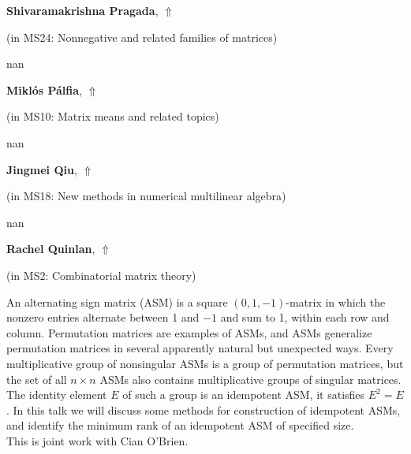 \documentclass[ILAS2025-program.tex]{subfiles}
\begin{document}
     \hypertarget{down0199}{}\begin{ilasabstract}
    
    \textbf{Shivaramakrishna Pragada},  \hfill \hyperlink{up0199}{$\Uparrow$}
    
    (in {\color{mstitle}MS24: Nonnegative and related families of matrices})
        
        \mtskip
    nan\end{ilasabstract}
     \hypertarget{down0132}{}\begin{ilasabstract}
    
    \textbf{Miklós Pálfia},  \hfill \hyperlink{up0132}{$\Uparrow$}
    
    (in {\color{mstitle}MS10: Matrix means and related topics})
        
        \mtskip
    nan\end{ilasabstract}
     \hypertarget{down0149}{}\begin{ilasabstract}
    
    \textbf{Jingmei Qiu},  \hfill \hyperlink{up0149}{$\Uparrow$}
    
    (in {\color{mstitle}MS18: New methods in numerical multilinear algebra})
        
        \mtskip
    nan\end{ilasabstract}
     \hypertarget{down0141}{}\begin{ilasabstract}
    
    \textbf{Rachel Quinlan},  \hfill \hyperlink{up0141}{$\Uparrow$}
    
    (in {\color{mstitle}MS2: Combinatorial matrix theory})
        
        \mtskip
    An alternating sign matrix (ASM) is a square $(0,1,-1)$-matrix in which the nonzero entries alternate between 1 and $-1$ and sum to 1, within each row and column. Permutation matrices are examples of ASMs, and ASMs generalize permutation matrices in several apparently natural but unexpected ways. Every multiplicative group of nonsingular ASMs is a group of permutation matrices, but the set of all $n\times n$ ASMs also contains multiplicative groups of singular matrices. The identity element $E$ of such a group is an idempotent ASM, it satisfies $E^2=E$. In this talk we will discuss some methods for construction of idempotent ASMs, and identify the minimum rank of an idempotent ASM of specified size. \\
This is joint work with Cian O'Brien.
\end{ilasabstract}
\end{document}
